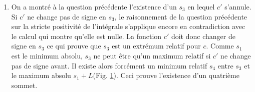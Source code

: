 \begin{enumerate}
\begin{enumerate}
\begin{displaymath}
\begin{aligned}
\overrightarrow \tau '(s) =& c(s) \overrightarrow n(s)
 \end{aligned}
\right\rbrace 
\Rightarrow
\left\lbrace 
\begin{aligned}
 X''(s) =& -c(s)Y'(s)\\ \\
 Y''(s) =& c(s)X'(s)
\end{aligned}
\right. 
\end{displaymath}
Utilisons maintenant l'intégration par parties 
\begin{multline*}
\int_{s_1}^{s_1+L}c'(s)Y(s)ds = \underset{=0 \;\text{ par périodicité}}{\underbrace{\left[ c(s)Y(s)\right]_{s_1}^{s_1+L}}}
- \int_{s_1}^{s_1+L}c(s)Y'(s)ds  \\
= \int_{s_1}^{s_1+L}X''(s)ds = \left[ X'(s)\right]_{s_1}^{s_1+L} = 0 \;\text{ par périodicité} 
\end{multline*}

\begin{figure}[ht]
 \centering

\caption{Graphe de $c$}
\label{fig:Csommets_3}
\end{figure}

\item On a montré à la question précédente l'existence d'un $s_3$ en lequel $c'$ s'annule. Si $c'$ ne change pas de signe en $s_3$, le raisonnement de la question précédente sur la stricte positivité de l'intégrale s'applique encore en contradiction avec le calcul qui montre qu'elle est nulle. La fonction $c'$ doit donc changer de signe en $s_3$ ce qui prouve que $s_3$ est un extrémum relatif pour $c$.\newline
Comme $s_1$ est le minimum absolu, $s_3$ ne peut être qu'un maximum relatif si $c'$ ne change pas de signe avant. Il existe alors forcément un minimum relatif $s_4$ entre $s_3$ et le maximum absolu $s_1+L$(Fig. \ref{fig:Csommets_3}).\newline
Ceci prouve l'existence d'un quatrième sommet.
\end{enumerate}
\end{enumerate}
\clearpage